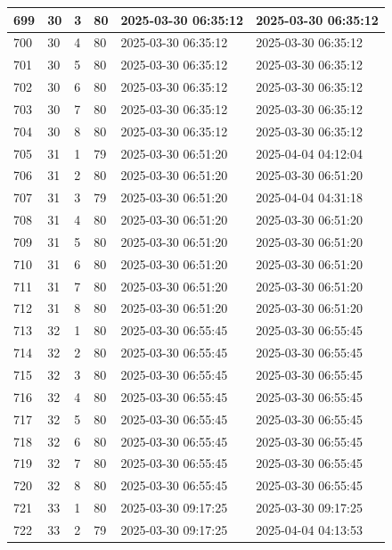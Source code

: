 \begin{longtable}{|l|l|l|l|l|l|}
699 & 30 & 3 & 80 & 2025-03-30 06:35:12 & 2025-03-30 06:35:12 \\ \hline 
700 & 30 & 4 & 80 & 2025-03-30 06:35:12 & 2025-03-30 06:35:12 \\ \hline 
701 & 30 & 5 & 80 & 2025-03-30 06:35:12 & 2025-03-30 06:35:12 \\ \hline 
702 & 30 & 6 & 80 & 2025-03-30 06:35:12 & 2025-03-30 06:35:12 \\ \hline 
703 & 30 & 7 & 80 & 2025-03-30 06:35:12 & 2025-03-30 06:35:12 \\ \hline 
704 & 30 & 8 & 80 & 2025-03-30 06:35:12 & 2025-03-30 06:35:12 \\ \hline 
705 & 31 & 1 & 79 & 2025-03-30 06:51:20 & 2025-04-04 04:12:04 \\ \hline 
706 & 31 & 2 & 80 & 2025-03-30 06:51:20 & 2025-03-30 06:51:20 \\ \hline 
707 & 31 & 3 & 79 & 2025-03-30 06:51:20 & 2025-04-04 04:31:18 \\ \hline 
708 & 31 & 4 & 80 & 2025-03-30 06:51:20 & 2025-03-30 06:51:20 \\ \hline 
709 & 31 & 5 & 80 & 2025-03-30 06:51:20 & 2025-03-30 06:51:20 \\ \hline 
710 & 31 & 6 & 80 & 2025-03-30 06:51:20 & 2025-03-30 06:51:20 \\ \hline 
711 & 31 & 7 & 80 & 2025-03-30 06:51:20 & 2025-03-30 06:51:20 \\ \hline 
712 & 31 & 8 & 80 & 2025-03-30 06:51:20 & 2025-03-30 06:51:20 \\ \hline 
713 & 32 & 1 & 80 & 2025-03-30 06:55:45 & 2025-03-30 06:55:45 \\ \hline 
714 & 32 & 2 & 80 & 2025-03-30 06:55:45 & 2025-03-30 06:55:45 \\ \hline 
715 & 32 & 3 & 80 & 2025-03-30 06:55:45 & 2025-03-30 06:55:45 \\ \hline 
716 & 32 & 4 & 80 & 2025-03-30 06:55:45 & 2025-03-30 06:55:45 \\ \hline 
717 & 32 & 5 & 80 & 2025-03-30 06:55:45 & 2025-03-30 06:55:45 \\ \hline 
718 & 32 & 6 & 80 & 2025-03-30 06:55:45 & 2025-03-30 06:55:45 \\ \hline 
719 & 32 & 7 & 80 & 2025-03-30 06:55:45 & 2025-03-30 06:55:45 \\ \hline 
720 & 32 & 8 & 80 & 2025-03-30 06:55:45 & 2025-03-30 06:55:45 \\ \hline 
721 & 33 & 1 & 80 & 2025-03-30 09:17:25 & 2025-03-30 09:17:25 \\ \hline 
722 & 33 & 2 & 79 & 2025-03-30 09:17:25 & 2025-04-04 04:13:53 \\ \hline 

\end{longtable}
